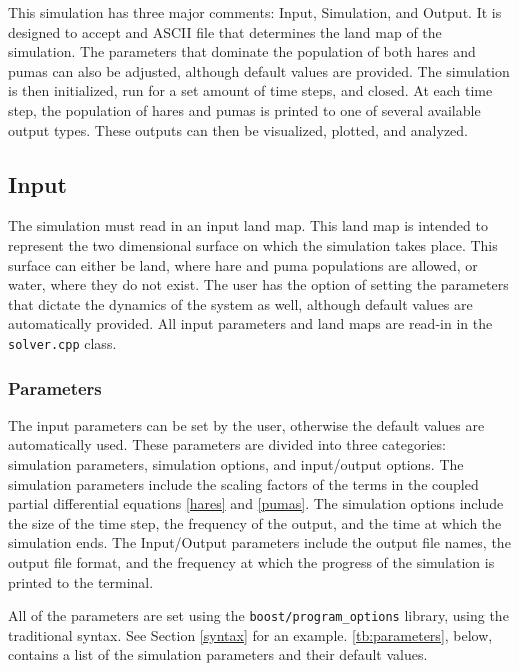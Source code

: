 \documentclass[a4paper,11pt]{article}
\begin{document}
{This simulation has three major comments: Input, Simulation, and Output.  It is designed to accept and ASCII file that determines the land map of the simulation.  The parameters that dominate the population of both hares and pumas can also be adjusted, although default values are provided.  The simulation is then initialized, run for a set amount of time steps, and closed.  At each time step, the population of hares and pumas is printed to one of several available output types.  These outputs can then be visualized, plotted, and analyzed.

\subsection{Input}

The simulation must read in an input land map.  This land map is intended to represent the two dimensional surface on which the simulation takes place.  This surface can either be land, where hare and puma populations are allowed, or water, where they do not exist.  The user has the option of setting the parameters that dictate the dynamics of the system as well, although default values are automatically provided.  All input parameters and land maps are read-in in the \texttt{solver.cpp} class.

\subsubsection{Parameters}\label{params}

The input parameters can be set by the user, otherwise the default values are automatically used.  These parameters are divided into three categories: simulation parameters, simulation options, and input/output options.  The simulation parameters include the scaling factors of the terms in the coupled partial differential equations \eqref{hares} and \eqref{pumas}.  The simulation options include the size of the time step, the frequency of the output, and the time at which the simulation ends.  The Input/Output parameters include the output file names, the output file format, and the frequency at which the progress of the simulation is printed to the terminal.  

All of the parameters are set using the \texttt{boost/program\_options} library, using the traditional syntax.  See Section \ref{syntax} for an example.  \ref{tb:parameters}, below, contains a list of the simulation parameters and their default values.

}
\end{document}
